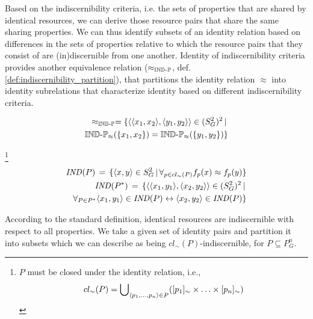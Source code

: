 Based on the indiscernibility criteria,
  i.e. the sets of properties that are shared by identical resources,
  we can derive those resource pairs that share
  the same sharing properties.
We can thus identify subsets of an identity relation based on
  differences in the sets of properties relative to which
  the resource pairs that they consist of are
  (in)discernible from one another.
Identity of indiscernibility criteria provides
  another equivalence relation
  ($\approx_{\operatorname{{\mathbb{IND}-\mathbb{P}}}}$, def. \ref{def:indiscernibility_partition}),
  that partitions the identity relation $\approx$ into
  identity subrelations that characterize identity based on different
  indiscernibility criteria.

\begin{definition}
\label{def:indiscernibility_partition}
\begin{align}
  \approx_{\operatorname{{\mathbb{IND}-\mathbb{P}}}}
=
  \{
    \langle\langle x_1,x_2\rangle,\langle y_1,y_2\rangle\rangle \in (S_G^2)^2
  \,\vert\,\\
    \operatorname{{\mathbb{IND}-\mathbb{P}}}_{\approx}(\{x_1,x_2\}) = \operatorname{{\mathbb{IND}-\mathbb{P}}}_{\approx}(\{y_1,y_2\})
  \}\nonumber
\end{align}
\end{definition}


\footnote{
  $P$ must be closed under the identity relation, i.e.,
  \begin{equation*}
    cl_{\sim}(P) = \bigcup_{\langle p_1,\ldots,p_n\rangle \in P}\nolimits (
      [p_1]_{\sim} \times \ldots \times [p_n]_{\sim}
    )
  \end{equation*}
}

\small
\begin{definition}[Indiscernibility]
\begin{align}
\label{def:resource_indiscernability}
\mathit{IND}(P) \,=\,
  \{
    \langle x,y\rangle \in S_G^2
  \,\vert\,
    \forall_{p \in cl_{\sim}(P)} f_p(x) \approx f_p(y)
  \}
\\
\label{pair indiscernibility}
\mathit{IND}(P^*) \,=\,
  \{
    \langle\langle x_1,y_1\rangle,\langle x_2,y_2\rangle\rangle \in (S_G^2)^2
  \,\vert\,\\
    \forall_{P \in P^*}
        \langle x_1,y_1\rangle \in \mathit{IND}(P)
      \leftrightarrow 
        \langle x_2,y_2\rangle \in \mathit{IND}(P)
  \}\nonumber
\end{align}
\end{definition}
\normalsize

\noindent According to the standard definition,
  identical resources are indiscernible with respect to all properties.
We take a given set of identity pairs and partition it into subsets which
  we can describe as being $cl_{\sim}(P)$-indiscernible,
  for $P \subseteq P_G^n$.

